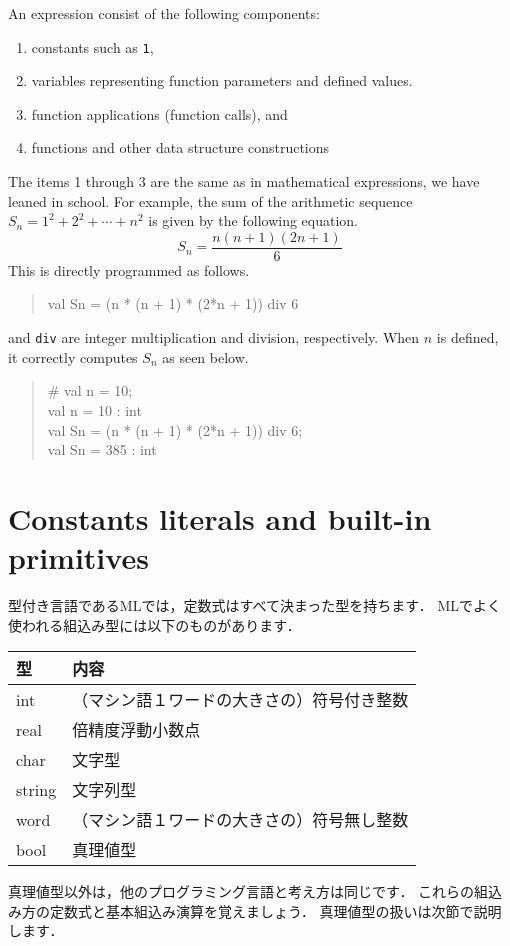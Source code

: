 \documentclass{jbook}
\newcommand{\txt}[2]{#2}
\newenvironment{program}{\begin{quote}\begin{tt}}%
                        {\end{tt}\end{quote}}
\begin{document}
	An expression consist of the following components:
\begin{enumerate}
\item constants such as {\tt 1},
\item variables representing function parameters and defined values.
\item function applications (function calls), and
\item functions and other data structure constructions
\end{enumerate}
	The items 1 through 3 are the same as in mathematical expressions,
we have leaned in school.
	For example, the sum of the arithmetic sequence 
$S_n = 1^2 + 2^2 + \cdots + n^2$
is given by the following equation.
\[
S_n = \frac{n (n + 1) (2n + 1)}{6}
\]
	This is directly programmed as follows.
\begin{program}
val Sn = (n * (n + 1) * (2*n + 1)) div 6
\end{program}
	{\tt *} and {\tt div} are integer multiplication and division,
respectively.
	When $n$ is defined, it correctly computes $S_n$ as seen below.
\begin{program}
\# val n = 10;\\
val n = 10 : int\\
val Sn = (n * (n + 1) * (2*n + 1)) div 6;\\
val Sn = 385 : int
\end{program}

\fi%

\section{
\txt{定数式と組込み関数}
{Constants literals and built-in primitives}
}
\label{sec:tutorialConstants}

\ifjp%
	型付き言語であるMLでは，定数式はすべて決まった型を持ちます．
	MLでよく使われる組込み型には以下のものがあります．

\begin{center}
\begin{tabular}{|l|l|}
\hline
型 & 内容
\\ \hline
int & （マシン語１ワードの大きさの）符号付き整数
\\ \hline
real & 倍精度浮動小数点
\\ \hline
char & 文字型
\\ \hline
string & 文字列型
\\ \hline
word & （マシン語１ワードの大きさの）符号無し整数
\\ \hline
bool & 真理値型
\\ \hline
\end{tabular}
\end{center}
	真理値型以外は，他のプログラミング言語と考え方は同じです．
	これらの組込み方の定数式と基本組込み演算を覚えましょう．
	真理値型の扱いは次節で説明します．	
\end{document}
